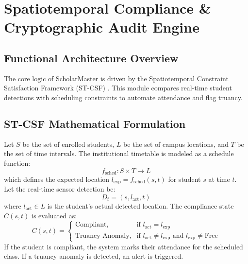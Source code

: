 \documentclass[12pt,a4paper,oneside]{report}
\begin{document}
\chapter{Spatiotemporal Compliance \& Cryptographic Audit Engine}
\thispagestyle{empty}

\section{Functional Architecture Overview}
The core logic of ScholarMaster is driven by the Spatiotemporal Constraint Satisfaction Framework (ST-CSF) \cite{spatiotemporal2018}. This module compares real-time student detections with scheduling constraints to automate attendance and flag truancy.

\section{ST-CSF Mathematical Formulation}
Let $S$ be the set of enrolled students, $L$ be the set of campus locations, and $T$ be the set of time intervals. The institutional timetable is modeled as a schedule function:
\begin{equation}
    f_{\text{sched}}: S \times T \to L
\end{equation}
which defines the expected location $l_{\text{exp}} = f_{\text{sched}}(s, t)$ for student $s$ at time $t$. Let the real-time sensor detection be:
\begin{equation}
    D_t = (s, l_{\text{act}}, t)
\end{equation}
where $l_{\text{act}} \in L$ is the student's actual detected location. The compliance state $C(s, t)$ is evaluated as:
\begin{equation}
    C(s, t) = \begin{cases}
        \text{Compliant}, & \text{if } l_{\text{act}} = l_{\text{exp}} \\
        \text{Truancy Anomaly}, & \text{if } l_{\text{act}} \neq l_{\text{exp}} \text{ and } l_{\text{exp}} \neq \text{Free}
    \end{cases}
\end{equation}
If the student is compliant, the system marks their attendance for the scheduled class. If a truancy anomaly is detected, an alert is triggered.
\end{document}
